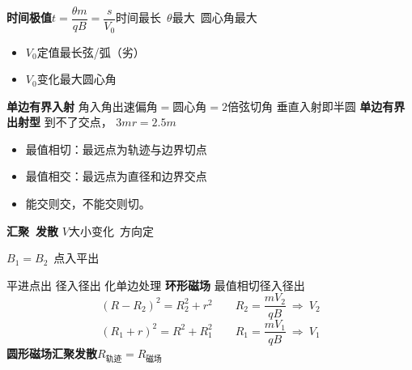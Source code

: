\textbf{时间极值}\quad $t=\dfrac{\theta m}{qB}=\dfrac{s}{V_0}$\quad 时间最长\ $\theta$最大\ 圆心角最大
\begin{itemize}
\item $V_0$定值\quad 最长弦/弧（劣）
\item $V_0$变化\quad 最大圆心角
\end{itemize}
\textbf{单边有界入射}
角入角出\quad 速偏角$=$圆心角$=2$倍弦切角
\quad {}
垂直入射即半圆
\textbf{单边有界出射型}\quad {}\quad {}
到不了交点，
$3\unit{m}$\quad $r=2.5\unit{m}$
\begin{itemize}
\item 最值相切：最远点为轨迹与边界切点
\item 最值相交：最远点为直径和边界交点
\item 能交则交，不能交则切。
\end{itemize}
\textbf{汇聚\ 发散}
$V$大小变化\ 方向定

$B_1=B_2$\ 点入平出

平进点出
径入径出
化单边处理
\textbf{环形磁场}
最值相切\quad 径入径出
\[ (R-R_2)^2=R_2^2+r^2 \qquad R_2=\frac{mV_2}{qB}\ \Rightarrow\ V_2 \]
\[ (R_1+r)^2=R^2+R_1^2 \qquad R_1=\frac{mV_1}{qB}\ \Rightarrow\ V_1 \]
\textbf{圆形磁场汇聚发散}\quad $R_{\text{轨迹}}=R_{\text{磁场}}$

